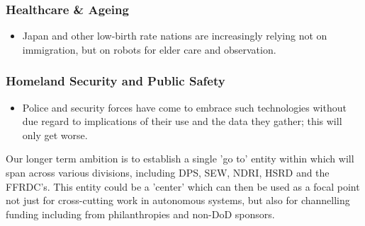 \documentclass[11pt,letterpaper]{article}
\begin{document}
\subsubsection{Healthcare \& Ageing}
\begin{itemize}
\item Japan and other low-birth rate nations are increasingly relying
  not on immigration, but on robots for elder care and observation. 

\end{itemize}

\subsubsection{Homeland Security and Public Safety}
\begin{itemize}

\item Police and security forces have come to embrace such
  technologies without due regard to implications of their use and the
  data they gather; this will only get worse.

\end{itemize}

Our longer term ambition is to establish a single 'go to' entity
within \org which will span across various divisions, including DPS,
SEW, NDRI, HSRD and the FFRDC's. This entity could be a 'center' which
can then be used as a focal point not just for cross-cutting work in
autonomous systems, but also for channelling funding including from
philanthropies and non-DoD sponsors.
\end{document}

